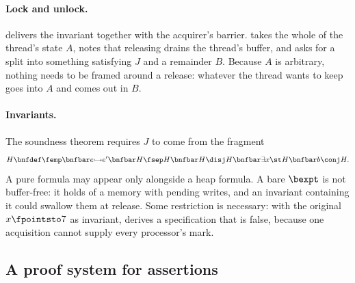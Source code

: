 \paragraph{Lock and unlock.}
 delivers the invariant together with the acquirer's barrier.
 takes the whole of the thread's state $A$, notes that releasing
drains the thread's buffer, and asks for a split into something satisfying
$J$ and a remainder $B$. Because $A$ is arbitrary, nothing needs to be
framed around a release: whatever the thread wants to keep goes into $A$
and comes out in $B$.

\paragraph{Invariants.}
The soundness theorem requires $J$ to come from the fragment
\[
  H \bnfdef \femp \bnfbar e \fcell e' \bnfbar H \fsep H \bnfbar H \disj H
    \bnfbar \exists x \st H \bnfbar b \conj H .
\]
A pure formula may appear only alongside a heap formula. A bare $\bexpt$
is not buffer-free: it holds of a memory with pending writes, and an
invariant containing it could swallow them at release. Some restriction is
necessary: with the original $x \fpointsto 7$ as invariant, 
derives a specification that is false, because one acquisition cannot
supply every processor's mark.

\subsection{A proof system for assertions}
\label{sec:assertion-rules}

